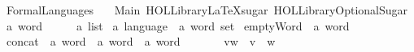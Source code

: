 %
\begin{isabellebody}%
%
%
\isadelimtheory
\isanewline
\isanewline
%
\endisadelimtheory
%
\isatagtheory
{}\isamarkupfalse%
\ FormalLanguages\isanewline
\ \ \ Main\ {\isachardoublequoteopen}HOL{\isacharminus}{\kern0pt}Library{\isachardot}{\kern0pt}LaTeXsugar{\isachardoublequoteclose}\ {\isachardoublequoteopen}HOL{\isacharminus}{\kern0pt}Library{\isachardot}{\kern0pt}OptionalSugar{\isachardoublequoteclose}\isanewline
{}%
\endisatagtheory
{\isafoldtheory}%
%
\isadelimtheory
%
\endisadelimtheory
%
\isadelimdocument
%
\endisadelimdocument
%
\isatagdocument
%
\isamarkuptrue%
%
\endisatagdocument
{\isafolddocument}%
%
\isadelimdocument
%
\endisadelimdocument
{}\isamarkupfalse%
\ {\isacharprime}{\kern0pt}a\ word\ \ \ \ \ {\isacharequal}{\kern0pt}\ {\isachardoublequoteopen}{\isacharprime}{\kern0pt}a\ list{\isachardoublequoteclose}\isanewline
{}\isamarkupfalse%
\ {\isacharprime}{\kern0pt}a\ language\ {\isacharequal}{\kern0pt}\ {\isachardoublequoteopen}{\isacharprime}{\kern0pt}a\ word\ set{\isachardoublequoteclose}%
\isadelimdocument
%
\endisadelimdocument
%
\isatagdocument
%
\isamarkuptrue%
%
\endisatagdocument
{\isafolddocument}%
%
\isadelimdocument
%
\endisadelimdocument
{}\isamarkupfalse%
\ emptyWord\ {\isacharcolon}{\kern0pt}{\isacharcolon}{\kern0pt}\ {\isachardoublequoteopen}{\isacharprime}{\kern0pt}a\ word{\isachardoublequoteclose}\ \ {\isacharparenleft}{\kern0pt}{\isachardoublequoteopen}{\isasymepsilon}{\isachardoublequoteclose}{\isacharparenright}{\kern0pt}\ \isanewline
\ \ {\isachardoublequoteopen}{\isasymepsilon}\ {\isasymequiv}\ {\isacharbrackleft}{\kern0pt}{\isacharbrackright}{\kern0pt}{\isachardoublequoteclose}\isanewline
\isanewline
{}\isamarkupfalse%
\ concat\ {\isacharcolon}{\kern0pt}{\isacharcolon}{\kern0pt}\ {\isachardoublequoteopen}{\isacharprime}{\kern0pt}a\ word\ {\isasymRightarrow}\ {\isacharprime}{\kern0pt}a\ word\ {\isasymRightarrow}\ {\isacharprime}{\kern0pt}a\ word{\isachardoublequoteclose}\ \ {\isacharparenleft}{\kern0pt}\ {\isachardoublequoteopen}{\isasymsqdot}{\isachardoublequoteclose}\ {}{}{\isacharparenright}{\kern0pt}\ \isanewline
\ \ {\isachardoublequoteopen}v{\isasymsqdot}w\ {\isasymequiv}\ v\ {\isacharat}{\kern0pt}\ w{\isachardoublequoteclose}\ \isanewline

\end{isabellebody}

